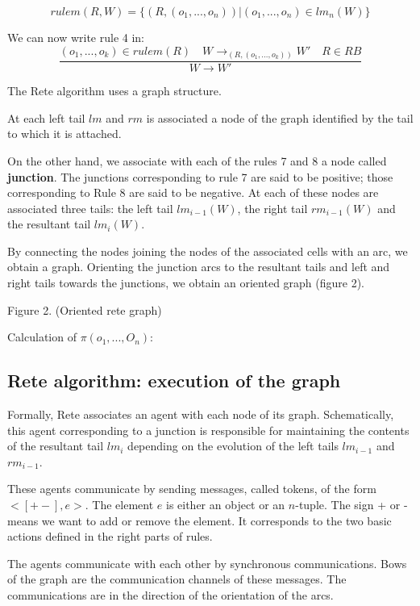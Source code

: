 \begin{equation}
rulem(R, W) = \{ (R, (o_1, ..., o_n)) | (o_1, ..., o_n) \in lm_n(W) \}
\end{equation}

We can now write rule 4 in:
\begin{equation}
\frac{(o_1, ..., o_{k}) \in rulem (R) \quad W \rightarrow_{(R, (o_1, ..., o_k))} W' \quad R \in RB }
{W \rightarrow W'}
\end{equation}

The Rete algorithm uses a graph structure.

At each left tail $lm$ and $rm$ is associated a node of the graph identified by the tail
to which it is attached.

On the other hand, we associate with each of the rules 7 and 8 a node called \textbf{junction}. The
junctions corresponding to rule 7 are said to be positive; those corresponding to Rule 8
are said to be negative. At each of these nodes are associated three tails: the left tail
$lm_{i-1} (W)$, the right tail $rm_{i-1} (W)$ and the resultant tail $lm_i (W)$.

By connecting the nodes joining the nodes of the associated cells with an arc, we obtain a
graph. Orienting the junction arcs to the resultant tails and left and right tails
towards the junctions, we obtain an oriented graph (figure 2).

Figure 2. (Oriented rete graph)

Calculation of $\pi(o_1, ..., O_n)$:

\subsection{Rete algorithm: execution of the graph}

Formally, Rete associates an agent with each node of its graph. Schematically,
this agent corresponding to a junction is responsible for maintaining the contents of the
resultant tail $lm_i$ depending on the evolution of the left tails $lm_{i-1}$ and $rm_{i-1}$.

These agents communicate by sending messages, called tokens, of the form
$<[+ -], e>$. The element $e$ is either an object or an $n$-tuple. The sign + or - means
we want to add or remove the element. It corresponds to the two basic actions
defined in the right parts of rules.

The agents communicate with each other by synchronous communications. Bows
of the graph are the communication channels of these messages. The communications
are in the direction of the orientation of the arcs.

